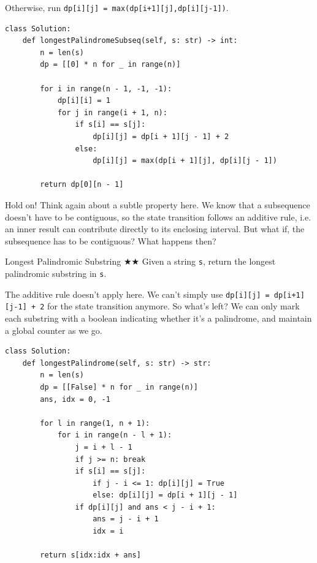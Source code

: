 \documentclass{article}
\begin{document}
Otherwise, run \texttt{dp[i][j] = max(dp[i+1][j],dp[i][j-1])}.

\begin{lstlisting}[style=python]
class Solution:
    def longestPalindromeSubseq(self, s: str) -> int:
        n = len(s)
        dp = [[0] * n for _ in range(n)]
        
        for i in range(n - 1, -1, -1):
            dp[i][i] = 1 
            for j in range(i + 1, n):
                if s[i] == s[j]:
                    dp[i][j] = dp[i + 1][j - 1] + 2
                else:
                    dp[i][j] = max(dp[i + 1][j], dp[i][j - 1])
                    
        return dp[0][n - 1]
\end{lstlisting}

Hold on! Think again about a subtle property here. We know that a subsequence doesn't have to be contiguous, so the state transition follows an additive rule, i.e. an inner result can contribute directly to its enclosing interval. But what if, the subsequence has to be contiguous? What happens then?

\begin{Question}{Longest Palindromic Substring
 $\bigstar$$\bigstar$}
Given a string \texttt{s}, return the longest palindromic substring in \texttt{s}.
\end{Question}

The additive rule doesn't apply here. We can't simply use \texttt{dp[i][j] = dp[i+1][j-1] + 2} for the state transition anymore. So what's left? We can only mark each substring with a boolean indicating whether it's a palindrome, and maintain a global counter as we go.

\begin{lstlisting}[style=python]
class Solution:
    def longestPalindrome(self, s: str) -> str:
        n = len(s)
        dp = [[False] * n for _ in range(n)]
        ans, idx = 0, -1
        
        for l in range(1, n + 1):
            for i in range(n - l + 1):
                j = i + l - 1
                if j >= n: break
                if s[i] == s[j]:
                    if j - i <= 1: dp[i][j] = True
                    else: dp[i][j] = dp[i + 1][j - 1]
                if dp[i][j] and ans < j - i + 1:
                    ans = j - i + 1
                    idx = i
                    
        return s[idx:idx + ans]
\end{lstlisting}
\end{document}

